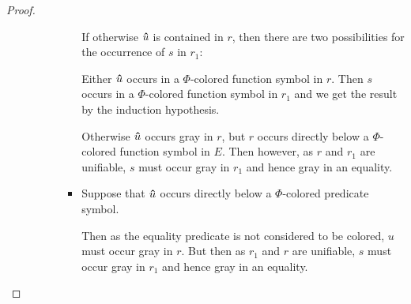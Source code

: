 \documentclass[%
	draft=false,%
	numbers=noendperiod,%
	11pt,%
	a4paper,%
	oneside,%
	openany,%
]{memoir}
\begin{document}
\begin{proof}
\begin{itemize}
\begin{itemize}
\begin{itemize}
\begin{itemize}
									If otherwise $\bm\hat u$ is contained in $r$, 
									then there are two possibilities for the occurrence of $s$ in $r_1$:

									Either $\bm\hat u$ occurs in a $\Phi$-colored function symbol in $r$. Then $s$ occurs in a $\Phi$-colored function symbol in $r_1$ and we get the result by the induction hypothesis.

									Otherwise $\bm\hat u$ occurs gray in $r$, but $r$ occurs directly below a $\Phi$-colored function symbol in $E$.
									Then however, as $r$ and $r_1$ are unifiable, $s$ must occur gray in $r_1$ and hence gray in an equality.

								\item
									Suppose that $\bm\hat u$ occurs directly below a $\Phi$-colored predicate symbol. 

									Then as the equality predicate is not considered to be colored, $u$ must occur gray in $r$.
									But then as $r_1$ and $r$ are unifiable, $s$ must occur gray in $r_1$ and hence gray in an equality.
									\qedhere
							\end{itemize}

					\end{itemize}

			\end{itemize}

	\end{itemize}


\end{proof}
\end{document}
